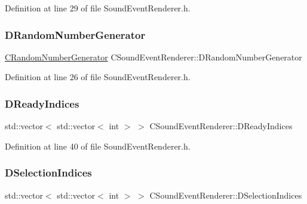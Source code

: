Definition at line 29 of file Sound\+Event\+Renderer.\+h.

\hypertarget{classCSoundEventRenderer_a591b9430a0f6a70259f87a2467de908f}{}\label{classCSoundEventRenderer_a591b9430a0f6a70259f87a2467de908f} 
\subsubsection{\texorpdfstring{D\+Random\+Number\+Generator}{DRandomNumberGenerator}}
{\footnotesize\ttfamily \hyperlink{classCRandomNumberGenerator}{C\+Random\+Number\+Generator} C\+Sound\+Event\+Renderer\+::\+D\+Random\+Number\+Generator\hspace{0.3cm}{\ttfamily [protected]}}



Definition at line 26 of file Sound\+Event\+Renderer.\+h.

\hypertarget{classCSoundEventRenderer_a68d2be3282880d4d7b47ee94b0a30139}{}\label{classCSoundEventRenderer_a68d2be3282880d4d7b47ee94b0a30139} 
\subsubsection{\texorpdfstring{D\+Ready\+Indices}{DReadyIndices}}
{\footnotesize\ttfamily std\+::vector$<$ std\+::vector$<$ int $>$ $>$ C\+Sound\+Event\+Renderer\+::\+D\+Ready\+Indices\hspace{0.3cm}{\ttfamily [protected]}}



Definition at line 40 of file Sound\+Event\+Renderer.\+h.

\hypertarget{classCSoundEventRenderer_afda3dfc8fa16264d91bc56a4bb1d150c}{}\label{classCSoundEventRenderer_afda3dfc8fa16264d91bc56a4bb1d150c} 
\subsubsection{\texorpdfstring{D\+Selection\+Indices}{DSelectionIndices}}
{\footnotesize\ttfamily std\+::vector$<$ std\+::vector$<$ int $>$ $>$ C\+Sound\+Event\+Renderer\+::\+D\+Selection\+Indices\hspace{0.3cm}{\ttfamily [protected]}}



